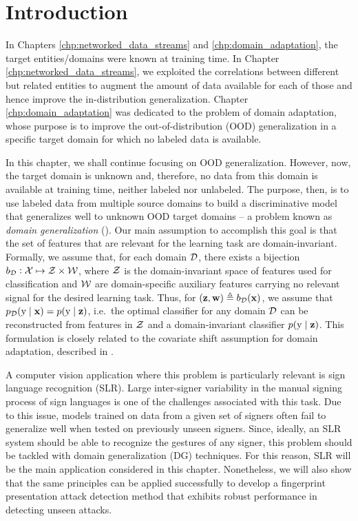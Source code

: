 \section{Introduction}
\label{sec:chp4_intro}
In Chapters \ref{chp:networked_data_streams} and \ref{chp:domain_adaptation}, the target entities/domains were known at training time. In Chapter \ref{chp:networked_data_streams}, we exploited the correlations between different but related entities to augment the amount of data available for each of those and hence improve the in-distribution generalization. Chapter \ref{chp:domain_adaptation} was dedicated to the problem of domain adaptation, whose purpose is to improve the out-of-distribution (OOD) generalization in a specific target domain for which no labeled data is available.

In this chapter, we shall continue focusing on OOD generalization. However, now, the target domain is unknown and, therefore, no data from this domain is available at training time, neither labeled nor unlabeled. The purpose, then, is to use labeled data from multiple source domains to build a discriminative model that generalizes well to unknown OOD target domains -- a problem known as \emph{domain generalization} (\citet{Blanchard2011, Muandet2013}). Our main assumption to accomplish this goal is that the set of features that are relevant for the learning task are domain-invariant. Formally, we assume that, for each domain ${\mathcal{D}}$, there exists a bijection $b_{\mathcal{D}}: {\mathcal{X}} \mapsto {\mathcal{Z}} \times {\mathcal{W}}$, where ${\mathcal{Z}}$ is the domain-invariant space of features used for classification and ${\mathcal{W}}$ are domain-specific auxiliary features carrying no relevant signal for the desired learning task. Thus, for $({\mathbf{z}}, {\mathbf{w}}) \triangleq b_{\mathcal{D}}({\mathbf{x}})$, we assume that $p_{\mathcal{D}}({\textnormal{y}} \mid {\mathbf{x}}) = p({\textnormal{y}} \mid {\mathbf{z}})$, i.e.\ the optimal classifier for any domain ${\mathcal{D}}$ can be reconstructed from features in ${\mathcal{Z}}$ and a domain-invariant classifier $p({\textnormal{y}} \mid {\mathbf{z}})$.  This formulation is closely related to the covariate shift assumption for domain adaptation, described in .

A computer vision application where this problem is particularly relevant is sign language recognition (SLR). Large inter-signer variability in the manual signing process of sign languages is one of the challenges associated with this task. Due to this issue, models trained on data from a given set of signers often fail to generalize well when tested on previously unseen signers. Since, ideally, an SLR system should be able to recognize the gestures of any signer, this problem should be tackled with domain generalization (DG) techniques. For this reason, SLR will be the main application considered in this chapter. Nonetheless, we will also show that the same principles can be applied successfully to develop a fingerprint presentation attack detection method that exhibits robust performance in detecting unseen attacks.

